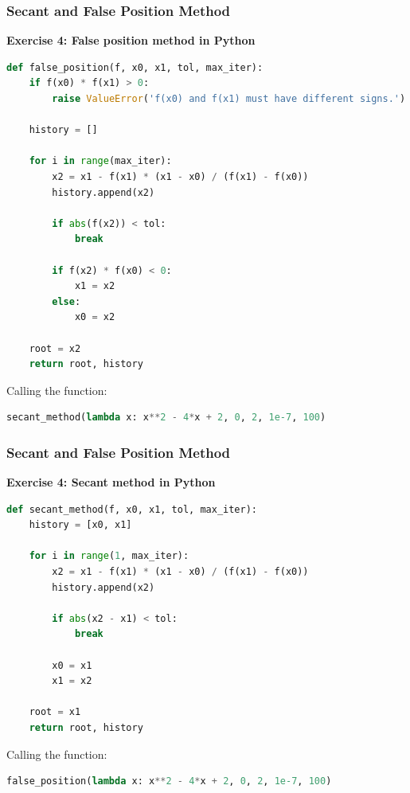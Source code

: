 \begin{frame}[fragile]
  \frametitle{Secant and False Position Method}

  \textbf{Exercise 4: False position method in Python}
  \begin{lstlisting}[language=Python,basicstyle=\scriptsize]
def false_position(f, x0, x1, tol, max_iter):
    if f(x0) * f(x1) > 0:
        raise ValueError('f(x0) and f(x1) must have different signs.')

    history = []

    for i in range(max_iter):
        x2 = x1 - f(x1) * (x1 - x0) / (f(x1) - f(x0))
        history.append(x2)

        if abs(f(x2)) < tol:
            break

        if f(x2) * f(x0) < 0:
            x1 = x2
        else:
            x0 = x2

    root = x2
    return root, history
  \end{lstlisting}
  
  Calling the function:
  \begin{lstlisting}[language=Python,basicstyle=\scriptsize]
secant_method(lambda x: x**2 - 4*x + 2, 0, 2, 1e-7, 100)
  \end{lstlisting}
\end{frame}

\begin{frame}[fragile]
  \frametitle{Secant and False Position Method}

  \textbf{Exercise 4: Secant method in Python}
  \begin{lstlisting}[language=Python, basicstyle=\scriptsize]
def secant_method(f, x0, x1, tol, max_iter):
    history = [x0, x1]
    
    for i in range(1, max_iter):
        x2 = x1 - f(x1) * (x1 - x0) / (f(x1) - f(x0))
        history.append(x2)

        if abs(x2 - x1) < tol:
            break

        x0 = x1
        x1 = x2

    root = x1
    return root, history
  \end{lstlisting}
  
  Calling the function:
  \begin{lstlisting}[language=Python, basicstyle=\small]
false_position(lambda x: x**2 - 4*x + 2, 0, 2, 1e-7, 100)
  \end{lstlisting}
\end{frame}

